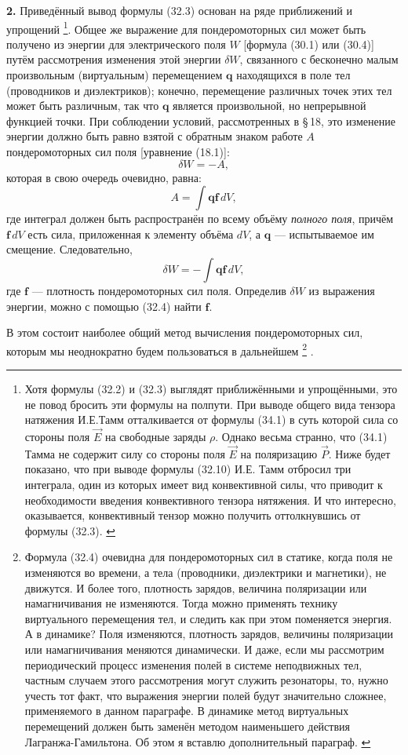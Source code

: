 \documentclass[a4paper,10pt]{article}
\newcommand{\modtext}[1]{\textcolor{modcolor}{#1}}
\begin{document}
\textbf{2.} Приведённый вывод формулы (32.3) основан на ряде
приближений и упрощений
\footnote{
\modtext{
Хотя формулы (32.2) и (32.3) выглядят приближёнными и упрощёнными, это не повод бросить эти формулы на полпути. При выводе общего вида тензора натяжения И.Е.Тамм отталкивается от формулы (34.1) в суть которой сила со стороны поля $\vec E$ на свободные заряды $\rho$. Однако весьма странно, что (34.1) Тамма не содержит силу со стороны поля $\vec E$ на поляризацию $\vec P$. Ниже будет показано, что при выводе формулы (32.10) И.Е. Тамм отбросил три интеграла, один из которых имеет вид конвективной силы, что приводит к необходимости введения конвективного тензора нятяжения. И что интересно, оказывается, конвективный тензор можно получить оттолкнувшись от формулы (32.3).
}
}. Общее же выражение для пондеромоторных сил
может быть получено из энергии для электрического поля $W$ [формула
(30.1) или (30.4)] путём рассмотрения изменения этой энергии $\delta W$,
связанного с бесконечно малым произвольным (виртуальным) перемещением
$\mathbf{q}$ находящихся в поле тел (проводников и диэлектриков);
конечно, перемещение различных точек этих тел может быть различным, так
что $\mathbf{q}$ является произвольной, но непрерывной функцией точки.
При соблюдении условий, рассмотренных в §\,18, это 
изменение энергии должно быть равно взятой с обратным знаком работе $A$
пондеромоторных сил поля [уравнение (18.1)]:
$$
    \delta W = -A,
$$
которая в свою очередь очевидно, равна:
$$
    A = \int \mathbf{q}\mathbf{f}\,dV,
$$
где интеграл должен быть распространён по всему объёму \textit{полного
поля}, причём $\mathbf{f}\,dV$ есть сила, приложенная к элементу объёма
$dV$, а $\mathbf{q}$ — испытываемое им смещение. Следовательно,
\begin{equation}
    \delta W = -\int \mathbf{q}\mathbf{f}\,dV,
    \tag{32.4}
\end{equation}
где $\mathbf{f}$ — плотность пондеромоторных сил поля. Определив
$\delta W$ из выражения энергии, можно с помощью (32.4) найти
$\mathbf{f}$.

В этом состоит наиболее общий метод вычисления пондеромоторных сил,
которым мы неоднократно будем пользоваться в дальнейшем
\footnote{
\modtext{
Формула (32.4) очевидна для пондеромоторных сил в статике, когда поля не изменяются во времени, а тела (проводники, диэлектрики и магнетики), не движутся. И более того, плотность зарядов, величина поляризации или намагничивания не изменяются. Тогда можно применять технику виртуального перемещения тел, и следить как при этом поменяется энергия.
А в динамике? Поля изменяются, плотность зарядов, величины поляризации или намагничивания меняются динамически.
И даже, если мы рассмотрим периодический процесс изменения полей в системе неподвижных тел, частным случаем этого рассмотрения могут служить резонаторы, то, нужно учесть тот факт, что выражения энергии полей будут значительно сложнее, применяемого в данном параграфе. В динамике метод виртуальных перемещений должен быть заменён методом наименьшего действия Лагранжа-Гамильтона. Об этом я вставлю дополнительный параграф.
}
}
.
\end{document}

